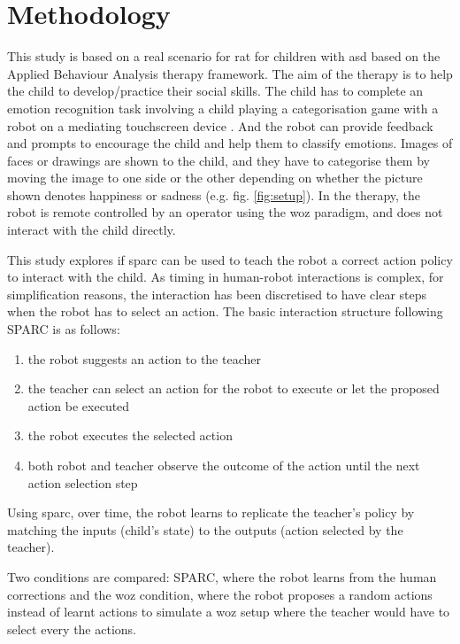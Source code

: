 \section{Methodology}

This study is based on a real scenario for \gls{rat} for children with \gls{asd} based on the Applied Behaviour Analysis therapy framework. The aim of the therapy is to help the child to develop/practice their social skills. The child has to complete an emotion recognition task involving a child playing a categorisation game with a robot on a mediating touchscreen device \cite{baxter2012touchscreen}. And the robot can provide feedback and prompts to encourage the child and help them to classify emotions. Images of faces or drawings are shown to the child, and they have to categorise them by moving the image to one side or the other depending on whether the picture shown denotes happiness or sadness (e.g. fig. \ref{fig:setup}). In the therapy, the robot is remote controlled by an operator using the \acrlong{woz} paradigm, and does not interact with the child directly. 

This study explores if \gls{sparc} can be used to teach the robot a correct action policy to interact with the child. As timing in human-robot interactions is complex, for simplification reasons, the interaction has been discretised to have clear steps when the robot has to select an action. The basic interaction structure following SPARC is as follows: 
\begin{enumerate}
	\item the robot suggests an action to the teacher
	\item the teacher can select an action for the robot to execute or let the proposed action be executed
	\item the robot executes the selected action 
	\item both robot and teacher observe the outcome of the action until the next action selection step
\end{enumerate}

Using \gls{sparc}, over time, the robot learns to replicate the teacher's policy by matching the inputs (child's state) to the outputs (action selected by the teacher). 


Two conditions are compared: SPARC, where the robot learns from the human corrections and the \gls{woz} condition, where the robot proposes a random actions instead of learnt actions to simulate a \gls{woz} setup where the teacher would have to select every the actions.

